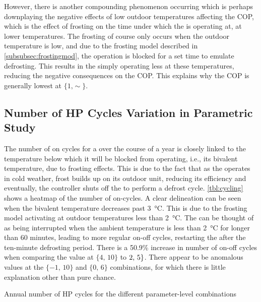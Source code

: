 However, there is another compounding phenomenon occurring which is perhaps downplaying the negative effects of low outdoor temperatures affecting the \ac{COP}, which is the effect of frosting on the time under which the \HP is operating at, at lower temperatures. The frosting of course only occurs when the outdoor temperature is low, and due to the frosting model described in \cref{subsubsec:frostingmod}, the \HP operation is blocked for a set time to emulate defrosting. This results in the \HP simply operating less at these temperatures, reducing the negative consequences on the \ac{COP}. This explains why the \ac{COP} is generally lowest at $\{1\text{,}\sim\}$. 

\subsection{Number of \acs{HP} Cycles Variation in Parametric Study}

The number of on cycles for a \HP over the course of a year is closely linked to the temperature below which it will be blocked from operating, i.e., its bivalent temperature, due to frosting effects. This is due to the fact that as the \HP operates in cold weather, frost builds up on its outdoor unit, reducing its efficiency and eventually, the controller shuts off the \HP to perform a defrost cycle. \cref{tbl:cycling} shows a heatmap of the number of on-cycles. A clear delineation can be seen when the bivalent temperature decreases past \qty{3}{\celsius}. This is due to the frosting model activating at outdoor temperatures less than \qty{2}{\celsius}. The \HP can be thought of as being interrupted when the ambient temperature is less than \qty{2}{\celsius} for longer than 60 minutes, leading to more regular on-off cycles, restarting the \HP after the ten-minute defrosting period. There is a 50.9\% increase in number of on-off cycles when comparing the value at  $\{4\text{, }10\}$ to $\-2\text{, }5\}$. There appear to be anomalous values at the $\{-1\text{, }10\}$ and $\{0\text{, }6\}$ combinations, for which there is little explanation other than pure chance.

\begin{table}[htb]
    \footnotesize
    \centering
    \caption{Annual number of \acs{HP} cycles for the different parameter-level combinations}
    \label{tbl:cycling}
\end{table}

